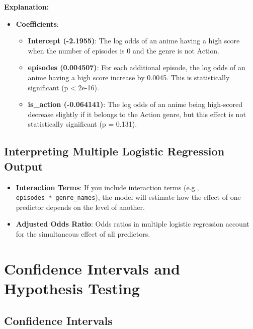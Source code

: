 \documentclass[
]{book}
\providecommand{\tightlist}{%
  \setlength{\itemsep}{0pt}\setlength{\parskip}{0pt}}
\begin{document}
\textbf{Explanation:}

\begin{itemize}
\tightlist
\item
  \textbf{Coefficients}:

  \begin{itemize}
  \tightlist
  \item
    \textbf{Intercept (-2.1955)}: The log odds of an anime having a high score when the number of episodes is 0 and the genre is not Action.
  \item
    \textbf{episodes (0.004507)}: For each additional episode, the log odds of an anime having a high score increase by 0.0045. This is statistically significant (p \textless{} 2e-16).
  \item
    \textbf{is\_action (-0.064141)}: The log odds of an anime being high-scored decrease slightly if it belongs to the Action genre, but this effect is not statistically significant (p = 0.131).
  \end{itemize}
\end{itemize}

\subsection*{Interpreting Multiple Logistic Regression Output}\label{interpreting-multiple-logistic-regression-output}

\begin{itemize}
\tightlist
\item
  \textbf{Interaction Terms}: If you include interaction terms (e.g., \texttt{episodes\ *\ genre\_names}), the model will estimate how the effect of one predictor depends on the level of another.
\item
  \textbf{Adjusted Odds Ratio}: Odds ratios in multiple logistic regression account for the simultaneous effect of all predictors.
\end{itemize}

\section{Confidence Intervals and Hypothesis Testing}\label{confidence-intervals-and-hypothesis-testing}

\subsection*{Confidence Intervals}\label{confidence-intervals}
\end{document}
